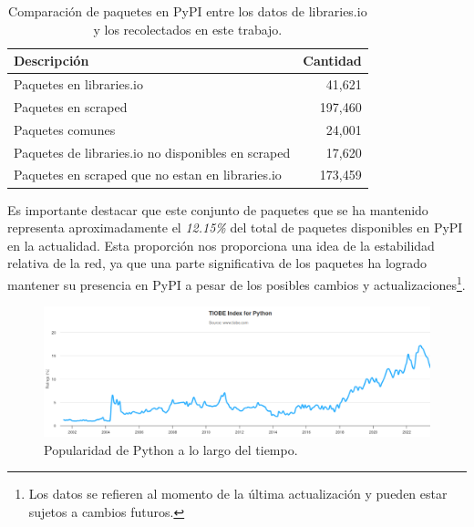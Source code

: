 \begin{table}[h!]
    \begin{center}
        \begin{tabular}{|l|r|}
            \hline
            \textbf{Descripción}                               & \textbf{Cantidad} \\
            \hline
            Paquetes en libraries.io                           & 41,621            \\
            Paquetes en scraped                                & 197,460           \\
            Paquetes comunes                                   & 24,001            \\
            Paquetes de libraries.io no disponibles en scraped & 17,620            \\
            Paquetes en scraped que no estan en libraries.io   & 173,459           \\
            \hline
        \end{tabular}
    \end{center}
    \label{tab:pypi_common_packages}
    \caption{Comparación de paquetes en PyPI entre los datos de libraries.io y los recolectados en este trabajo.}
\end{table}

Es importante destacar que este conjunto de paquetes que se ha mantenido representa aproximadamente
el \textit{12.15\%} del total de paquetes disponibles en PyPI en la actualidad. Esta proporción nos
proporciona una idea de la estabilidad relativa de la red, ya que una parte significativa de los
paquetes ha logrado mantener su presencia en PyPI a pesar de los posibles cambios y
actualizaciones\footnote{Los datos se refieren al momento de la última actualización y pueden estar
    sujetos a cambios futuros.}.

\begin{figure}[h!]
    \begin{center}
        \includegraphics[width=1\textwidth]{img/pypi/pypi_popularity.png}
        \caption{Popularidad de Python a lo largo del tiempo.}
        \label{fig:pypi_popularity}
    \end{center}
\end{figure}


